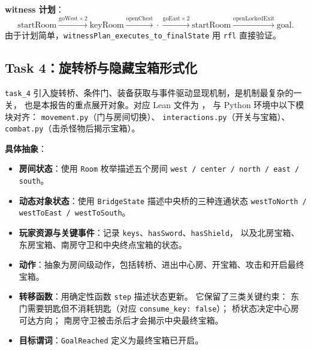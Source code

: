 \documentclass[12pt,a4paper]{ctexart}
\begin{document}
\textbf{witness 计划}：
\[
\text{startRoom} \xrightarrow{\text{goWest}\times 2} \text{keyRoom}
  \xrightarrow{\text{openChest}} \cdot
  \xrightarrow{\text{goEast}\times 2} \text{startRoom}
  \xrightarrow{\text{openLockedExit}} \text{goal}.
\]
由于计划简单，\texttt{witnessPlan\_executes\_to\_finalState} 用 \texttt{rfl} 直接验证。

\subsection{Task 4：旋转桥与隐藏宝箱形式化}

\texttt{task\_4} 引入旋转桥、条件门、装备获取与事件驱动显现机制，是机制最复杂的一关，
也是本报告的重点展开对象。对应 Lean 文件为
，
与 Python 环境中以下模块对齐：
\texttt{movement.py}（门与房间切换）、
\texttt{interactions.py}（开关与宝箱）、
\texttt{combat.py}（击杀怪物后揭示宝箱）。

\textbf{具体抽象}：
\begin{itemize}[leftmargin=2em]
  \item \textbf{房间状态}：使用 \texttt{Room} 枚举描述五个房间
  \texttt{west / center / north / east / south}。
  \item \textbf{动态对象状态}：使用 \texttt{BridgeState} 描述中央桥的三种连通状态
  \texttt{westToNorth / westToEast / westToSouth}。
  \item \textbf{玩家资源与关键事件}：记录
  \texttt{keys}、\texttt{hasSword}、\texttt{hasShield}，
  以及北房宝箱、东房宝箱、南房守卫和中央终点宝箱的状态。
  \item \textbf{动作}：抽象为房间级动作，包括转桥、进出中心房、开宝箱、攻击和开启最终宝箱。
  \item \textbf{转移函数}：用确定性函数 \texttt{step} 描述状态更新。
  它保留了三类关键约束：
  东门需要钥匙但不消耗钥匙（对应 \texttt{consume\_key: false}）；
  桥状态决定中心房可达方向；
  南房守卫被击杀后才会揭示中央最终宝箱。
  \item \textbf{目标谓词}：\texttt{GoalReached} 定义为最终宝箱已开启。
\end{itemize}
\end{document}

